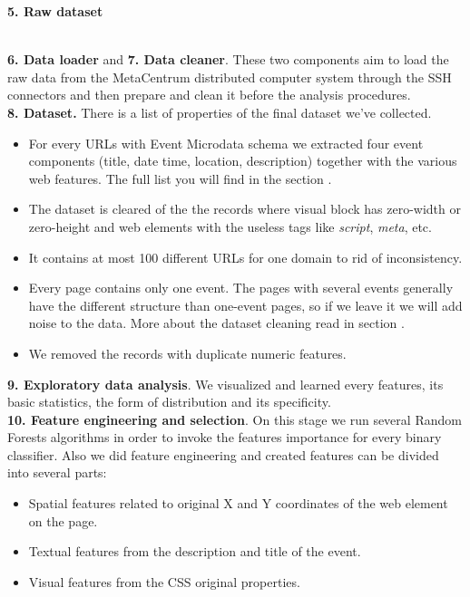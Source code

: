 \textbf{5. Raw dataset}\\\

\textbf{6. Data loader} and \textbf{7. Data cleaner}. These two components aim to load the raw data from the MetaCentrum distributed computer system through the SSH connectors and then prepare and clean it before the analysis procedures.\\

\textbf{8. Dataset.} There is a list of properties of the final dataset we've collected.

\begin{itemize}
    \item For every URLs with Event Microdata schema we extracted four event components (title, date time, location, description) together with the various web features. The full list you will find in the section . 
    \item The dataset is cleared of the the records where visual block has zero-width or zero-height and web elements with the useless tags like \textit{script}, \textit{meta}, etc.
    \item It contains at most 100 different URLs for one domain to rid of inconsistency. 
    \item Every page contains only one event. The pages with several events generally have the different structure than one-event pages, so if we leave it we will add noise to the data. More about the dataset cleaning read in section .  
    \item We removed the records with duplicate numeric features.
\end{itemize}

\textbf{9. Exploratory data analysis}. We visualized and learned every features, its basic statistics, the form of distribution and its specificity.\\

\textbf{10. Feature engineering and selection}. On this stage we run several Random Forests algorithms in order to invoke the features importance for every binary classifier. Also we did feature engineering and created features can be divided into several parts:
\begin{itemize}
\item Spatial features related to original X and Y coordinates of the web element on the page.
\item Textual features from the description and title of the event. 
\item Visual features from the CSS original properties.  
\end{itemize}

